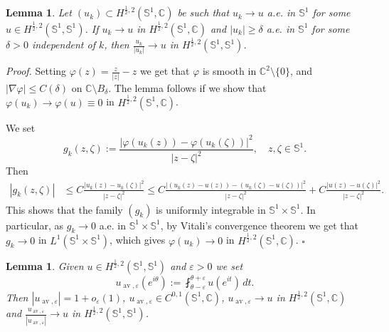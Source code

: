 \documentclass[12pt, a4paper]{article}
\newtheorem{lem}[thm]{Lemma}
\newenvironment{proof}{\noindent\emph{Proof.}}{\hfill$\square$\medskip}
\newcommand{\sph}{\mathbb{S}}
\newcommand{\vp}{\varphi}
\newcommand{\R}{\mathbb{R}}
\newcommand{\ve}{\varepsilon}
\renewcommand{\(}{\left(}
\renewcommand{\)}{\right)}
\DeclareMathOperator{\av}{av}
\begin{document}
\begin{lem} \label{lem-Vitali} Let $(u_k)\subset H^{\frac12,2}(\sph^1,\mathbb{C})$ be such that $u_k\to u$ a.e. in $\sph^1$ for some $u\in H^{\frac12,2}(\sph^1,\sph^1)$. If $u_k\to u$ in $H^{\frac12,2}(\sph^1,\mathbb{C})$ and  $|u_k|\geq\delta$ a.e. in $\sph^1$ for some $\delta>0$ independent of $k$, then  $\frac{u_k}{|u_k|}\to u$ in $H^{\frac12,2}(\sph^1,\sph^1)$.  \end{lem}
\begin{proof} Setting  $\vp(z)=\frac{z}{|z|}-z$ we get that  $\vp$ is smooth in $\mathbb{C}^2\setminus\{0\}$, and $|\nabla \vp|\leq C(\delta)$ on $\mathbb{C}\setminus B_\delta$. The lemma follows if  we show that $\vp(u_k)\to \vp(u)\equiv0$ in  $H^{\frac12,2}(\sph^1,\mathbb{C})$.




We set $$g_k(z,\zeta):=\frac{|\vp( u_k(z))-\vp(u_k(\zeta))|^2}{|z-\zeta|^2},\quad z,\zeta\in\sph^1.$$
Then \begin{align*}
|g_ k(z,\zeta)|&\leq  C\frac{|u_k(z)- u_k(\zeta)|^2}{|z-\zeta|^2}\leq  C \frac{|(u_k(z)-u(z))-( u_k(\zeta)-u(\zeta))|^2}{|z-\zeta|^2}+ C\frac{|u(z)- u(\zeta)|^2}{|z-\zeta|^2}.\end{align*} This shows that the family $(g_k)$ is uniformly integrable in $\sph^1\times\sph^1$. In particular, as $g_k\to 0$ a.e. in $\sph^1\times\sph^1$, by Vitali's convergence theorem we get that $g_k\to0$ in $L^1 (\sph^1\times\sph^1)$, which gives $\vp(u_k)\to 0$ in  $H^{\frac12,2}(\sph^1,\mathbb{C})$. 
\end{proof}

\begin{lem}\label{l:approx0} Given  $u\in H^{\frac{1}{2},2}(\sph^1,\sph^1)$ and $\ve>0$ we set $$u_{\av,\ve}(e^{i\theta}):=\fint_{\theta-\ve}^{\theta+\ve} u(e^{it})\, dt.$$
Then $|u_{\av,\ve}|=1+o_\ve(1)$,  $u_{\av,\ve}\in C^{0,1}(\sph^1,\mathbb C)$, $u_{\av,\ve}\to u$ in  $H^{\frac12,2}(\sph^1,\mathbb{C})$ and $\frac{u_{\av,\ve}}{|u_{\av,\ve}|}\to u$ in  $H^{\frac12,2}(\sph^1,\sph^1)$. 
\end{lem}
\end{document}
